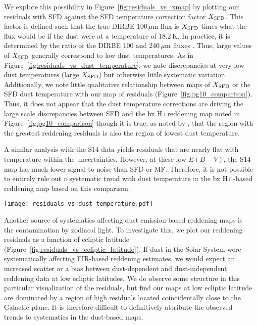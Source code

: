 \documentclass[iop,apj]{emulateapj}
\makeatletter
\def\testbx{bx}%
\DeclareRobustCommand{\ion}[2]{%
\relax\ifmmode
\ifx\testbx\f@series
{\mathbf{#1\,\mathsc{#2}}}\else
{\mathrm{#1\,\mathsc{#2}}}\fi
\else\textup{#1\,{\mdseries\textsc{#2}}}%
\fi}
\makeatother
\begin{document}
We explore this possibility in Figure~\ref{fig:residuals_vs_xmap} by plotting our residuals with SFD against the SFD temperature correction factor $X_{\rm SFD}$. This factor is defined such that the true DIRBE 100\,$\mu$m flux is $X_{\rm SFD}$ times what the flux would be if the dust were at a temperature of 18.2\,K. In practice, it is determined by the ratio of the DIRBE 100 and 240\,$\mu$m fluxes \citep[see][Section 2.4.2 for details]{Schlegel+Finkbeiner+Davis_1998}. Thus, large values of $X_{\rm SFD}$ generally correspond to low dust temperatures. As in Figure~\ref{fig:residuals_vs_dust_temperature}, we note discrepancies at very low dust temperatures (large $X_{\rm SFD}$) but otherwise little systematic variation. Additionally, we note little qualitative relationship between maps of $X_{\rm SFD}$ or the SFD dust temperature with our map of residuals (Figure~\ref{fig:pg10_comparison}). Thus, it does not appear that the dust temperature corrections are driving the large scale discrepancies between SFD and the \ion{H}{i} reddening map noted in Figure~\ref{fig:pg10_comparison} though it is true, as noted by \citet{Peek+Graves_2010}, that the region with the greatest reddening residuals is also the region of lowest dust temperature.

A similar analysis with the S14 data yields residuals that are nearly flat with temperature within the uncertainties. However, at these low $E(B-V)$, the S14 map has much lower signal-to-noise than SFD or MF. Therefore, it is not possible to entirely rule out a systematic trend with dust temperature in the \ion{H}{i}-based reddening map based on this comparison.

\begin{figure*}[tp]
	\texttt{[image: residuals\_vs\_dust\_temperature.pdf]}
	\caption{Reddening residuals with dust emission-based maps as a function of dust temperature. The contour lines indicate 25, 50, and 75\% of the data points. Systematic trends with dust temperature are evident in all panels.}
	\label{fig:residuals_vs_dust_temperature}
\end{figure*}

Another source of systematics affecting dust emission-based reddening maps is the contamination by zodiacal light. To investigate this, we plot our reddening residuals as a function of ecliptic latitude (Figure~\ref{fig:residuals_vs_ecliptic_latitude}). If dust in the Solar System were systematically affecting FIR-based reddening estimates, we would expect an increased scatter or a bias between dust-dependent and dust-independent reddening data at low ecliptic latitudes. We do observe some structure in this particular visualization of the residuals, but find our maps at low ecliptic latitude are dominated by a region of high residuals located coincidentally close to the Galactic plane. It is therefore difficult to definitively attribute the observed trends to systematics in the dust-based maps.
\end{document}
